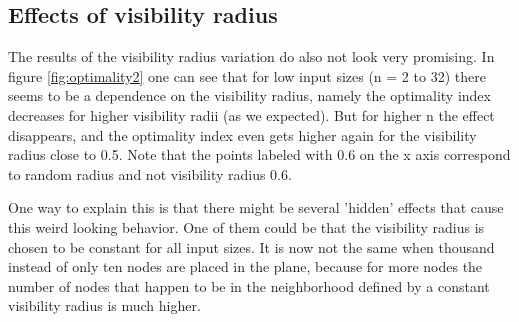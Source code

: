 \documentclass[11pt]{article}
\begin{document}
\subsection{Effects of visibility radius}

The results of the visibility radius variation do also not look very promising. In figure \ref{fig:optimality2} one can see that for low input sizes
(n = 2 to 32) there seems to be a dependence on the visibility radius, namely the optimality index decreases for higher visibility radii
(as we expected). But for higher n the effect disappears, and the optimality index even gets higher again for the visibility radius close to
0.5. Note that the points labeled with 0.6 on the x axis correspond to random radius and not visibility radius 0.6.

One way to explain this is that there might be several 'hidden' effects that cause this weird looking behavior. One of them could be that
the visibility radius is chosen to be constant for all input sizes. It is now not the same when thousand instead of only ten nodes are placed
in the plane, because for more nodes the number of nodes that happen to be in the neighborhood defined by a constant visibility radius is much
higher.
\end{document}

